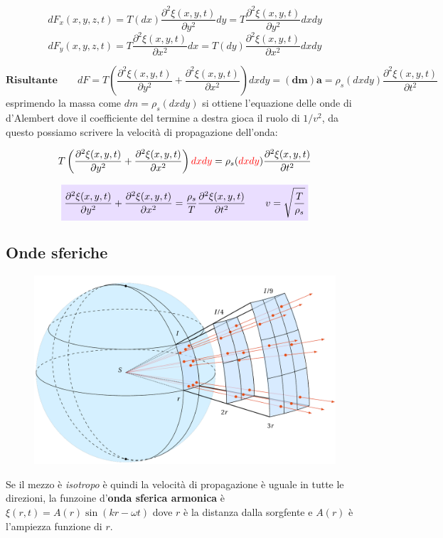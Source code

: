 \documentclass[x11names]{report}
\newcommand{\viola}[1]{\colorbox{yred}{$\displaystyle #1$}}
\begin{document}
	\[ 
	dF_x(x,y,z,t) = T(dx)\frac{\partial^2 \xi(x,y,t)}{\partial y^2}dy = T\frac{\partial^2\xi(x,y,t)}{\partial y^2}dxdy
	\]
	\[ 
	dF_y(x,y,z,t) = T\frac{\partial^2 \xi(x,y,t)}{\partial x^2}dx = T(dy)\frac{\partial^2\xi(x,y,t)}{\partial x^2}dxdy 
	\]
	
	\[ 
	\textbf{Risultante} \qquad	dF = T\left(\frac{\partial^2\xi(x,y,t)}{\partial y^2} + \frac{\partial^2\xi(x,y,t)}{\partial x^2}\right)dxdy \mathbf{=(dm)a = }  \rho_s(dxdy)\frac{\partial^2\xi(x,y,t)}{\partial t^2}
	\]
	esprimendo la massa come \(dm = \rho_s (dxdy)\) si ottiene l'equazione delle onde di d'Alembert dove il coefficiente del termine a destra gioca il ruolo di \(1/v^2\), da questo possiamo scrivere la velocità di propagazione dell'onda:
	
	\[ 
	T\left(\frac{\partial^2\xi(x,y,t)}{\partial y^2} + \frac{\partial^2\xi(x,y,t)}{\partial x^2}\right)\textcolor{red}{dxdy} = \rho_s(\textcolor{red}{dxdy})\frac{\partial^2\xi(x,y,t)}{\partial t^2}
	\]
	
	\vspace{0.3cm}
	\begin{equation}
		\viola{\frac{\partial^2\xi(x,y,t)}{\partial y^2} + \frac{\partial^2\xi(x,y,t)}{\partial x^2} = \frac{\rho_s}{T}\frac{\partial^2\xi(x,y,t)}{\partial t^2} \qquad v = \sqrt{\frac{T}{\rho_s}}}
	\end{equation}
	\vspace{0.2cm}
	
	
	\newpage
	\subsection{Onde sferiche}
	\begin{figure}
		\begin{center}
			\includegraphics[scale=0.15]{imgs/ondesferiche.png}
		\end{center}
	\end{figure}
	Se il mezzo è \textit{isotropo} è quindi la velocità di propagazione è uguale in tutte le direzioni, la funzoine d'\textbf{onda sferica armonica} è \(\xi(r,t) = A(r)\sin\left(kr -\omega t\right)\) dove \(r\) è la distanza dalla sorgfente e \(A(r)\) è l'ampiezza funzione di \(r\). \\
	
\end{document}
